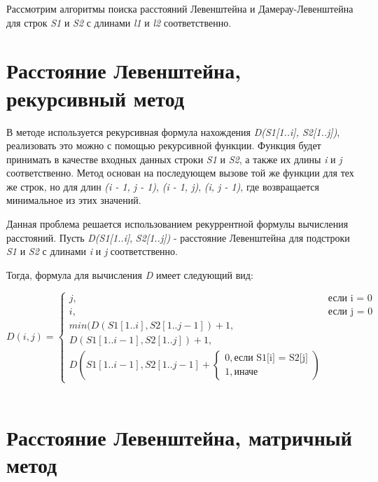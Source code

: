 \documentclass[12pt,a4paper]{report}
\begin{document}
Рассмотрим алгоритмы поиска расстояний Левенштейна и Дамерау-Левенштейна для строк \textit{S1} и \textit{S2} с длинами 
\textit{l1} и \textit{l2} соответственно.

\section{Расстояние Левенштейна, рекурсивный метод}

В методе используется рекурсивная формула нахождения \textit{ D(S1[1..i], S2[1..j])}, реализовать это можно 
с помощью рекурсивной функции. Функция будет принимать в качестве входных данных строки \textit{S1} и \textit{S2}, а 
также их длины \textit{i} и \textit{j} соответственно. Метод основан на последующем вызове той же функции для тех же 
строк, но для длин \textit{(i - 1, j - 1)}, \textit{(i - 1, j)}, \textit{(i, j - 1)}, где возвращается минимальное из этих значений. 

Данная проблема решается использованием рекуррентной формулы вычисления расстояний. Пусть \textit{D(S1[1..i]}, 
\textit{S2[1..j])} - расстояние Левенштейна для подстроки \textit{S1} и \textit{S2} с длинами \textit{i} и \textit{j} соответственно.\

Тогда, формула для вычисления \textit{D} имеет следующий вид:

\begin{displaymath}
    D(i,j) = \left\{ 
        \begin{array}{ll}
            j, & \textrm{если i = 0} \\
            i, & \textrm{если j = 0} \\
            min(D(S1[1..i], S2[1..j-1]) + 1,\\
                D(S1[1..i-1], S2[1..j]) + 1,\\
                D(S1[1..i-1], S2[1..j-1] + \left \{ 
                \begin{array}{ll}
                    0, \textrm{если S1[i] = S2[j]} \\ 
                    1, \textrm{иначе}
                \end{array} \right.
            )
        \end{array} \right.
\end{displaymath} \\

\section{Расстояние Левенштейна, матричный метод}
\end{document}

